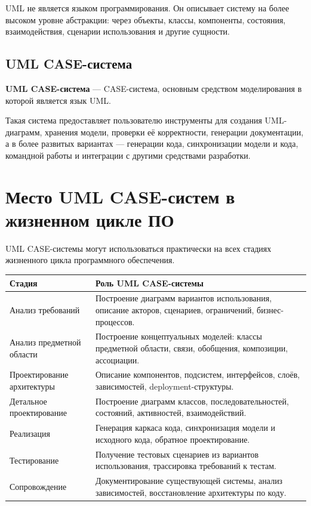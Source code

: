 \documentclass[12pt,a4paper]{article}
\begin{document}
UML не является языком программирования. Он описывает систему на более высоком уровне абстракции: через объекты, классы, компоненты, состояния, взаимодействия, сценарии использования и другие сущности.

\subsection{UML CASE-система}

\textbf{UML CASE-система} --- CASE-система, основным средством моделирования в которой является язык UML.

Такая система предоставляет пользователю инструменты для создания UML-диаграмм, хранения модели, проверки её корректности, генерации документации, а в более развитых вариантах --- генерации кода, синхронизации модели и кода, командной работы и интеграции с другими средствами разработки.

\section{Место UML CASE-систем в жизненном цикле ПО}

UML CASE-системы могут использоваться практически на всех стадиях жизненного цикла программного обеспечения.

\begin{longtable}{p{}p{}}
\toprule
\textbf{Стадия} & \textbf{Роль UML CASE-системы} \\
\midrule
Анализ требований &
Построение диаграмм вариантов использования, описание акторов, сценариев, ограничений, бизнес-процессов. \\
\addlinespace

Анализ предметной области &
Построение концептуальных моделей: классы предметной области, связи, обобщения, композиции, ассоциации. \\
\addlinespace

Проектирование архитектуры &
Описание компонентов, подсистем, интерфейсов, слоёв, зависимостей, deployment-структуры. \\
\addlinespace

Детальное проектирование &
Построение диаграмм классов, последовательностей, состояний, активностей, взаимодействий. \\
\addlinespace

Реализация &
Генерация каркаса кода, синхронизация модели и исходного кода, обратное проектирование. \\
\addlinespace

Тестирование &
Получение тестовых сценариев из вариантов использования, трассировка требований к тестам. \\
\addlinespace

Сопровождение &
Документирование существующей системы, анализ зависимостей, восстановление архитектуры по коду. \\
\bottomrule
\end{longtable}
\end{document}
